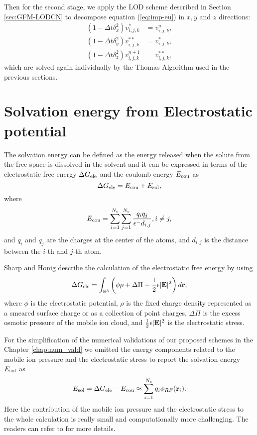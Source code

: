  Then for the second stage, we apply the LOD scheme described in Section \ref{sec:GFM-LODCN} to decompose equation (\ref{eq:imp-eu}) in $x,y$ and $z$ directions:
 \begin{eqnarray}
		(1-\Delta t \delta_x^2)v^*_{i,j,k} &= v^n_{i,j,k},\nonumber\\
		(1-\Delta t \delta_y^2)v^{**}_{i,j,k} &= v^*_{i,j,k},\\
		(1-\Delta t \delta_z^2)v^{n+1}_{i,j,k} &= v^{**}_{i,j,k},\nonumber
\end{eqnarray}	
which are solved again individually by the Thomas Algorithm used in the previous sections. 

\section{Solvation energy from Electrostatic potential}

The solvation energy can be defined as the energy released when the solute from the free space is dissolved in the solvent and it can be expressed in terms of the electrostatic free energy $\Delta G_{\rm ele}$ and the coulomb energy $E_{\rm cou}$ as
\begin{equation}
	\Delta G_{\rm ele}= E_{\rm cou}+ E_{\rm sol},\label{eq_Gele}
\end{equation}
where
\begin{equation}	
	E_{\rm cou} = \sum_{i=1}^{N_c}\sum_{j=1}^{N_c}\frac{q_iq_j}{\epsilon^-d_{i,j}}, i\neq j,\label{eq_Ecou}
\end{equation}
and $q_i$ and $q_j$ are the charges at the center of the atoms, and $d_{i,j}$ is the distance between the $i$-th and $j$-th atom. 

Sharp and Honig \cite{Sharp_Honig} describe the calculation of the electrostatic free energy by using 
\begin{equation}
\Delta G_{\rm ele}=\int_{\mathbb{R}^3}\left(\phi\rho+\Delta\Pi-\frac{1}{2}\epsilon|{\bf E}|^2\right)d{\bf r},
\end{equation}
where $\phi$ is the electrostatic potential, $\rho$ is the fixed charge density represented as a smeared surface charge or as a collection of point charges, $\Delta\Pi$ is  the excess osmotic pressure of the mobile ion cloud, and $\frac{1}{2}\epsilon|{\bf E}|^2$ is the electrostatic stress.

For the simplification of the numerical validations of our proposed schemes in the Chapter \ref{chap:num_vald} we omitted the energy components related to the mobile ion pressure and the electrostatic stress to report the solvation energy $E_{\rm sol}$ as  
\begin{equation}
	E_{\rm sol}=\Delta G_{\rm ele}-E_{\rm cou}\approx\sum\limits_{i=1}^{N_c}q_i\phi_{RF} ({\bf r}_i).\label{eq:solvation}
\end{equation}
Here the contribution of the mobile ion pressure and the electrostatic stress to the whole calculation is really small and computationally more challenging. The readers can refer to \cite{GENG_WEI2011,Gilson,Sharp_Honig} for more details.	 
